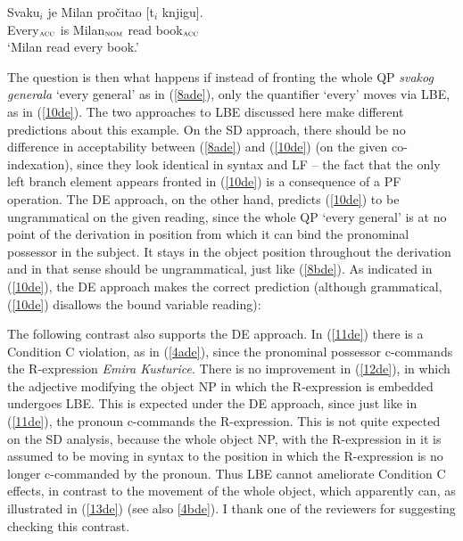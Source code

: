\documentclass[output=paper]{langscibook}
\begin{document}
\begin{exe}
\ex \label{9de}
\gll Svaku$_{i}$ je Milan pročitao [t$_{i}$  knjigu].\\
Every$_{\textsc{acc}}$ is Milan$_{\textsc{nom}}$ read {} book$_{\textsc{acc}}$\\
\glt ‘Milan read every book.’ 
\end{exe}

The question is then what happens if instead of fronting the whole QP \textit{svakog generala} ‘every general’ as in (\ref{8ade}), only the quantifier ‘every’ moves via LBE, as in (\ref{10de}). The two approaches to LBE discussed here make different predictions about this example. On the SD approach, there should be no difference in acceptability between (\ref{8ade}) and (\ref{10de}) (on the given co-indexation), since they look identical in syntax and LF  – the fact that the only left branch element appears fronted in (\ref{10de}) is a consequence of a PF operation. The DE approach, on the other hand, predicts (\ref{10de}) to be ungrammatical on the given reading, since the whole QP ‘every general’ is at no point of the derivation in position from which it can bind the pronominal possessor in the subject. It stays in the object position throughout the derivation and in that sense should be ungrammatical, just like (\ref{8bde}). As indicated in (\ref{10de}), the DE approach makes the correct prediction (although grammatical, (\ref{10de}) disallows the bound variable reading): 

\begin{exe}
\end{exe}

The following contrast also supports the DE approach. In (\ref{11de}) there is a Condition C violation, as in (\ref{4ade}), since the pronominal possessor c-commands the R-expression \textit{Emira Kusturice}. There is no improvement in (\ref{12de}), in which the adjective modifying the object NP in which the R-expression is embedded undergoes LBE. This is expected under the DE approach, since just like in (\ref{11de}), the pronoun c-commands the R-expression. This is not quite expected on the SD analysis, because the whole object NP, with the R-expression in it is assumed to be moving in syntax to the position in which the R-expression is no longer c-commanded by the pronoun. Thus LBE cannot ameliorate Condition C effects, in contrast to the movement of the whole object, which apparently can, as illustrated in (\ref{13de}) (see also \ref{4bde}). I thank one of the reviewers for suggesting checking this contrast. 
\end{document}

